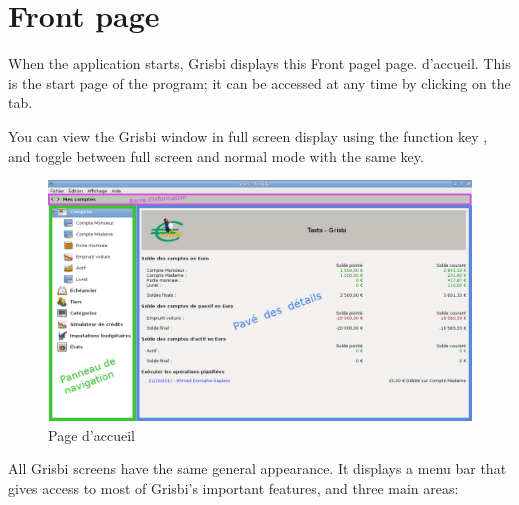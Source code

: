 
\chapter{Front page\label{home}}


When the application starts, Grisbi displays this
\ifIllustration Front pagel page.
\else d'accueil.
\fi
This is the start page of the program; it can be accessed at any time by clicking on the   tab. 

You can view the Grisbi window in full screen display  using the function key , and toggle between full screen and normal mode with the same key.

\ifIllustration
\begin{figure}[htbp]
\begin{center}
\includegraphics[scale=0.35]{image/screenshot/home}
\end{center}
\caption{Page d'accueil}
\label{home-img}
\end{figure}
\fi

All Grisbi screens have the same general appearance. It displays a menu bar that gives access to most of Grisbi's important features, and three main areas:

